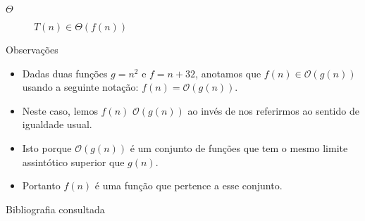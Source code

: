 \documentclass[
    mode=present,
    style=dvn,
    paper=screen,
    display=slidesnotes,
    size=14pt,
]{powerdot}
\theoremstyle{plain}
\theoremstyle{definition}
\theoremstyle{remark}
\begin{document}
\begin{slide}{$\Theta$}
    \begin{figure}
        
        \caption{$T(n){\in}\Theta(f(n))$}
    \end{figure}
\end{slide}

\begin{slide}{Observações}
    \begin{itemize}
        \item Dadas duas funções $g=n^2$ e $f=n + 32$, anotamos que $f(n){\in}\mathcal{O}(g(n))$ usando a seguinte notação: $f(n) = \mathcal{O}(g(n))$. 
        \item Neste caso, lemos $f(n)$  $\mathcal{O}(g(n))$ ao invés de nos referirmos ao sentido de igualdade usual.
        \item Isto porque $\mathcal{O}(g(n))$ é um conjunto de funções que tem o mesmo limite assintótico superior que $g(n)$.
        \item Portanto $f(n)$ é uma função que pertence a esse conjunto.
    \end{itemize}
\end{slide}


\begin{slide}{Bibliografia consultada}
    
    
\end{slide}
\end{document}
